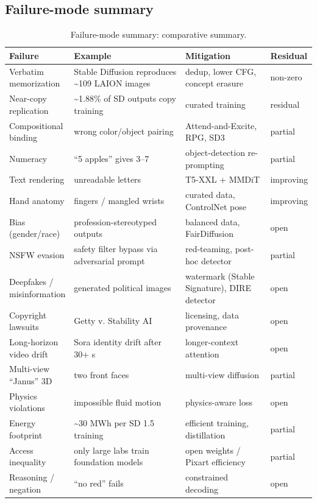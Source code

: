 \documentclass{article}
\begin{document}
\subsection{Failure-mode summary}\label{failure-mode-summary}

\begin{table}[t]
\centering
\caption{Failure-mode summary: comparative summary.}
\label{tab:failure-mode-summary}
\begin{tabular}{>{\raggedright\arraybackslash}p{0.1884\linewidth}
  >{\raggedright\arraybackslash}p{0.4348\linewidth}
  >{\raggedright\arraybackslash}p{0.3116\linewidth}
  >{\raggedright\arraybackslash}p{0.0652\linewidth}}
\toprule
Failure & Example & Mitigation & Residual \\
\midrule
Verbatim memorization & Stable Diffusion reproduces \textasciitilde109 LAION images \citep{carlini2023extractingtraining} & dedup, lower CFG, concept erasure & non-zero \\
Near-copy replication & \textasciitilde1.88\% of SD outputs copy training \citep{somepalli2023diffusionartordigi} & curated training & residual \\
Compositional binding & wrong color/object pairing & Attend-and-Excite, RPG, SD3 & partial \\
Numeracy & ``5 apples'' gives 3--7 & object-detection re-prompting & partial \\
Text rendering & unreadable letters & T5-XXL + MMDiT & improving \\
Hand anatomy & 6 fingers / mangled wrists & curated data, ControlNet pose & improving \\
Bias (gender/race) & profession-stereotyped outputs & balanced data, FairDiffusion & open \\
NSFW evasion & safety filter bypass via adversarial prompt & red-teaming, post-hoc detector & partial \\
Deepfakes / misinformation & generated political images & watermark (Stable Signature), DIRE detector & open \\
Copyright lawsuits & Getty v. Stability AI & licensing, data provenance & open \\
Long-horizon video drift & Sora identity drift after 30+ s & longer-context attention & open \\
Multi-view ``Janus'' 3D & two front faces & multi-view diffusion & partial \\
Physics violations & impossible fluid motion & physics-aware loss & open \\
Energy footprint & \textasciitilde30 MWh per SD 1.5 training & efficient training, distillation & partial \\
Access inequality & only large labs train foundation models & open weights / Pixart efficiency & partial \\
Reasoning / negation & ``no red'' fails & constrained decoding & open \\
\end{tabular}
\end{table}
\end{document}
